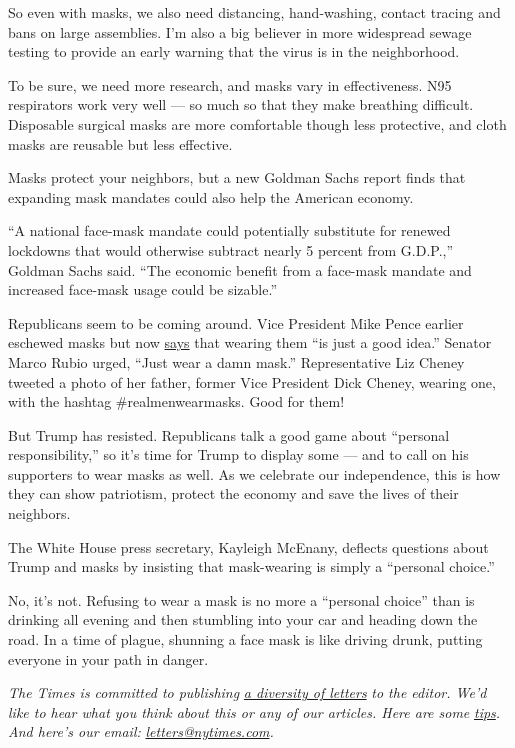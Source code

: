 So even with masks, we also need distancing, hand-washing, contact
tracing and bans on large assemblies. I'm also a big believer in more
widespread sewage testing to provide an early warning that the virus is
in the neighborhood.

To be sure, we need more research, and masks vary in effectiveness. N95
respirators work very well --- so much so that they make breathing
difficult. Disposable surgical masks are more comfortable though less
protective, and cloth masks are reusable but less effective.

Masks protect your neighbors, but a new Goldman Sachs report finds that
expanding mask mandates could also help the American economy.

``A national face-mask mandate could potentially substitute for renewed
lockdowns that would otherwise subtract nearly 5 percent from G.D.P.,''
Goldman Sachs said. ``The economic benefit from a face-mask mandate and
increased face-mask usage could be sizable.''

Republicans seem to be coming around. Vice President Mike Pence earlier
eschewed masks but now
\href{https://abcnews.go.com/Politics/mandatory-mask-rulestrump-insists-personal-choice/story?id=71519019}{says}
that wearing them ``is just a good idea.'' Senator Marco Rubio urged,
``Just wear a damn mask.'' Representative Liz Cheney tweeted a photo of
her father, former Vice President Dick Cheney, wearing one, with the
hashtag \#realmenwearmasks. Good for them!

But Trump has resisted. Republicans talk a good game about ``personal
responsibility,'' so it's time for Trump to display some --- and to call
on his supporters to wear masks as well. As we celebrate our
independence, this is how they can show patriotism, protect the economy
and save the lives of their neighbors.

The White House press secretary, Kayleigh McEnany, deflects questions
about Trump and masks by insisting that mask-wearing is simply a
``personal choice.''

No, it's not. Refusing to wear a mask is no more a ``personal choice''
than is drinking all evening and then stumbling into your car and
heading down the road. In a time of plague, shunning a face mask is like
driving drunk, putting everyone in your path in danger.

\emph{The Times is committed to publishing}
\href{https://www.nytimes.com/2019/01/31/opinion/letters/letters-to-editor-new-york-times-women.html}{\emph{a
diversity of letters}} \emph{to the editor. We'd like to hear what you
think about this or any of our articles. Here are some}
\href{https://help.nytimes.com/hc/en-us/articles/115014925288-How-to-submit-a-letter-to-the-editor}{\emph{tips}}\emph{.
And here's our email:}
\href{mailto:letters@nytimes.com}{\emph{letters@nytimes.com}}\emph{.}

